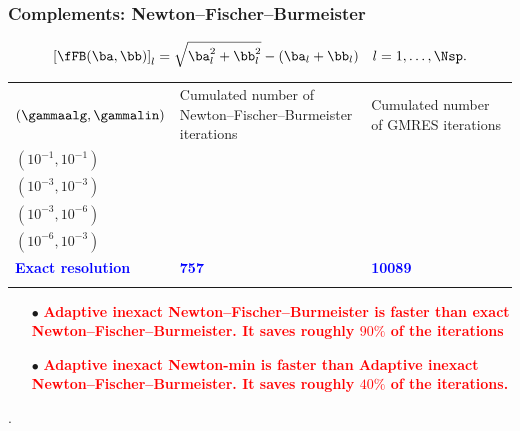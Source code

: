 \documentclass[10 pt]{beamer}
\begin{document}
\begin{frame}
\frametitle{Complements: Newton--Fischer--Burmeister}
\textcolor{cadmiumgreen}{
\begin{equation*}
\left[\fFB (\ba, \bb)\right]_l = \sqrt{\ba_l^2 + \bb_l^2} - (\ba_l + \bb_l) \quad l=1,\ldots,\Nsp.
\end{equation*}
}
\scriptsize {\begin{table}
\centering
\begin{tabular}{lll}
\hline\noalign{\smallskip}
$\left(\gammaalg,\gammalin\right)$ & \hspace{-0.3 cm} \parbox{4.5 cm}{Cumulated number of Newton--Fischer--Burmeister iterations} &   \parbox{3.5 cm}{Cumulated number of GMRES  iterations}  \\
\noalign{\smallskip}\hline\noalign{\smallskip}
$\left(10^{-1},10^{-1} \right)$ &  & \quad {} \\
$\left(10^{-3},10^{-3}\right)$ &  & \quad {} \\
$\left(10^{-3},10^{-6}\right)$ &  & \quad {} \\
$\left(10^{-6},10^{-3}\right)$ &  & \quad {} \\
\textcolor{blue}{\textbf{Exact resolution}} & \qquad \textcolor{blue}{\textbf{757}} & \quad \hspace{0.2 cm} \quad \textcolor{blue}{\textbf{10089}} \\
\noalign{\smallskip}\hline
\end{tabular}
\end{table}
}

\normalsize
\begin{itemize}
\item[$\bullet$]  \textcolor{red}{\textbf{Adaptive inexact Newton--Fischer--Burmeister is faster than exact Newton--Fischer--Burmeister. It saves roughly $90 \%$  of the iterations}}
\item[$\bullet$] \textcolor{red}{\textbf{Adaptive inexact Newton-min is faster than Adaptive inexact Newton--Fischer--Burmeister. It saves roughly $40 \%$ of the iterations.}}
\end{itemize}. 

\end{frame}
\end{document}
